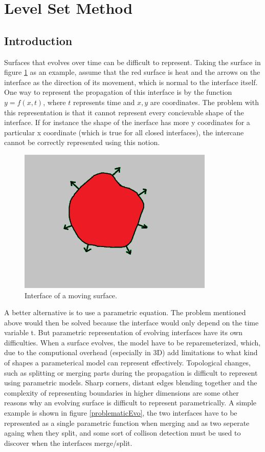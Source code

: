 \section{Level Set Method}
\label{levelSetChap}
\subsection{Introduction}
Surfaces that evolves over time can be difficult to represent. Taking the surface in figure \ref{interface} as an example, assume that the red surface is heat and the arrows on the interface as the direction of its movement, which is normal to the interface itself. One way to represent the propagation of this interface is by the function $y = f(x,t)$, where $t$ represents time and $x,y$ are coordinates. The problem with this representation is that it cannot represent every concievable shape of the interface. If for instance the shape
of the inerface has more y coordinates for a particular x coordinate (which is true for all closed interfaces), the intercane cannot be correctly represented using this notion.
\begin{figure}[h!]
\centering
\includegraphics[width=.5\textwidth]{backgroundTheory/levelset/interface}
\caption{Interface of a moving surface.}
\label{interface}
\end{figure}
A better alternative is to use a parametric equation. The problem mentioned above would then be solved because the interface would only depend on the time variable t. But parametric representation of evolving interfaces have its own difficulties. When a surface evolves, the model have to be reparemeterized, which, due to the computional overhead (especially in 3D) add limitations to what kind of shapes a parameterical model can represent effectively. Topological changes, such as splitting or merging parts during the propagation is difficult to represent using parametric models. Sharp corners, distant edges blending together and the complexity of representing boundaries in higher dimensions are some other reasons why an evolving surface is difficult to represent parametrically. A simple example is shown in figure \ref{problematicEvo}, the two interfaces have to be represented as a single parametric function when merging and as two seperate againg when they split, and some sort of collison detection must be used to discover when the interfaces merge/split.
